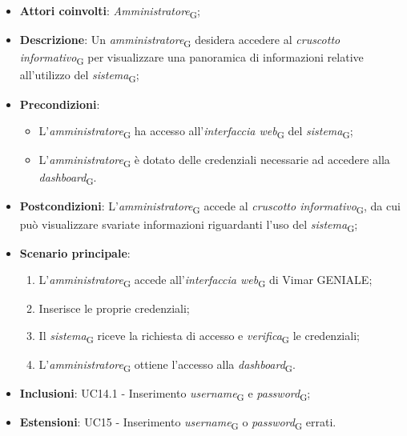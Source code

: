 \begin{itemize}
    \item \textbf{Attori coinvolti}: \textit{Amministratore}\textsubscript{G};
    \item \textbf{Descrizione}: Un \textit{amministratore}\textsubscript{G} desidera accedere al \textit{cruscotto informativo}\textsubscript{G} per visualizzare una panoramica di informazioni relative all’utilizzo del \textit{sistema}\textsubscript{G};
    \item \textbf{Precondizioni}: 
    \begin{itemize}
        \item L’\textit{amministratore}\textsubscript{G} ha accesso all’\textit{interfaccia web}\textsubscript{G} del \textit{sistema}\textsubscript{G};
        \item L’\textit{amministratore}\textsubscript{G} è dotato delle credenziali necessarie ad accedere alla \textit{dashboard}\textsubscript{G}.
    \end{itemize}
    \item \textbf{Postcondizioni}: L’\textit{amministratore}\textsubscript{G} accede al \textit{cruscotto informativo}\textsubscript{G}, da cui può visualizzare svariate informazioni riguardanti l’uso del \textit{sistema}\textsubscript{G};
    \item \textbf{Scenario principale}:
    \begin{enumerate}
        \item L’\textit{amministratore}\textsubscript{G} accede all’\textit{interfaccia web}\textsubscript{G} di Vimar GENIALE;
        \item Inserisce le proprie credenziali;
        \item Il \textit{sistema}\textsubscript{G} riceve la richiesta di accesso e \textit{verifica}\textsubscript{G} le credenziali;
        \item L’\textit{amministratore}\textsubscript{G} ottiene l’accesso alla \textit{dashboard}\textsubscript{G}.
    \end{enumerate}
    \item \textbf{Inclusioni}: UC14.1 - Inserimento \textit{username}\textsubscript{G} e \textit{password}\textsubscript{G};
    \item \textbf{Estensioni}: UC15 - Inserimento \textit{username}\textsubscript{G} o \textit{password}\textsubscript{G} errati.
\end{itemize}
